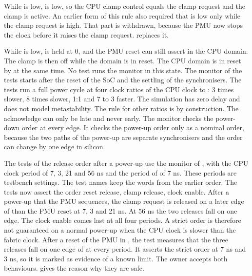 \begin{information}
While  is low,  is low, so the CPU clamp control equals the clamp request and the clamp is active. An earlier form of this rule also required that  is low only while the clamp request is high. That part is withdrawn, because the PMU now stops the clock before it raises the clamp request.  replaces it.

While  is low,  is held at 0, and the PMU reset can still assert in the CPU domain. The clamp is then off while the domain is in reset. The CPU domain is in reset by  at the same time. No test runs the monitor in this state. The monitor of the tests starts after the reset of the SoC and the settling of the synchronisers. The tests run a full power cycle at four clock ratios of the CPU clock to : 3 times slower, 8 times slower, 1:1 and 7 to 3 faster. The simulation has zero delay and does not model metastability. The rule for other ratios is by construction. The acknowledge can only be late and never early. The monitor checks the power-down order at every edge. It checks the power-up order only as a nominal order, because the two paths of the power-up are separate synchronisers and the order can change by one edge in silicon.

The tests of the release order after a power-up use the monitor of , with the CPU clock period of 7, 3, 21 and 56 ns and the period of  of 7 ns. These periods are testbench settings. The test names keep the words  from the earlier order. The tests now assert the order reset release, clamp release, clock enable. After a power-up that the PMU sequences, the clamp request is released on a later edge of  than the PMU reset at 7, 3 and 21 ns. At 56 ns the two releases fall on one edge. The clock enable comes last at all four periods. A strict order is therefore not guaranteed on a normal power-up when the CPU clock is slower than the fabric clock. After a reset of the PMU in , the test  measures that the three releases fall on one edge of  at every period. It asserts the strict order at 7 ns and 3 ns, so it is marked  as evidence of a known limit. The owner accepts both behaviours.  gives the reason why they are safe.
\end{information}

